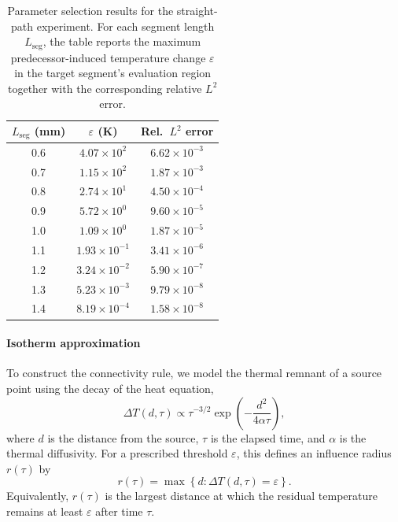 \documentclass[conference]{IEEEtran}
\begin{document}
\begin{table}[h]
\centering
\caption{Parameter selection results for the straight-path experiment. For each segment length $L_{\mathrm{seg}}$, the table reports the maximum predecessor-induced temperature change $\varepsilon$ in the target segment's evaluation region together with the corresponding relative $L^2$ error.}
\label{tab:calibration}
\begin{tabular}{ccc}
\hline
$L_{\text{seg}}$ (mm) & $\varepsilon$ (K) & Rel.\ $L^2$ error \\
\hline
0.6 & $4.07\times10^{2}$ & $6.62\times10^{-3}$ \\
0.7 & $1.15\times10^{2}$ & $1.87\times10^{-3}$ \\
0.8 & $2.74\times10^{1}$ & $4.50\times10^{-4}$ \\
0.9 & $5.72\times10^{0}$ & $9.60\times10^{-5}$ \\
1.0 & $1.09\times10^{0}$ & $1.87\times10^{-5}$ \\
1.1 & $1.93\times10^{-1}$ & $3.41\times10^{-6}$ \\
1.2 & $3.24\times10^{-2}$ & $5.90\times10^{-7}$ \\
1.3 & $5.23\times10^{-3}$ & $9.79\times10^{-8}$ \\
1.4 & $8.19\times10^{-4}$ & $1.58\times10^{-8}$ \\
\hline
\end{tabular}
\end{table}

\paragraph{Isotherm approximation}
To construct the connectivity rule, we model the thermal remnant of a source point using the decay of the heat equation,
\begin{equation}
\Delta T(d,\tau) \propto \tau^{-3/2}\exp\!\left(-\frac{d^2}{4\alpha \tau}\right),
\label{eq:point_source_decay}
\end{equation}
where $d$ is the distance from the source, $\tau$ is the elapsed time, and $\alpha$ is the thermal diffusivity. For a prescribed threshold $\varepsilon$, this defines an influence radius $r(\tau)$ by
\begin{equation}
r(\tau) = \max\left\{d : \Delta T(d,\tau)=\varepsilon\right\}.
\label{eq:isotherm_radius}
\end{equation}
Equivalently, $r(\tau)$ is the largest distance at which the residual temperature remains at least $\varepsilon$ after time $\tau$.
\end{document}
